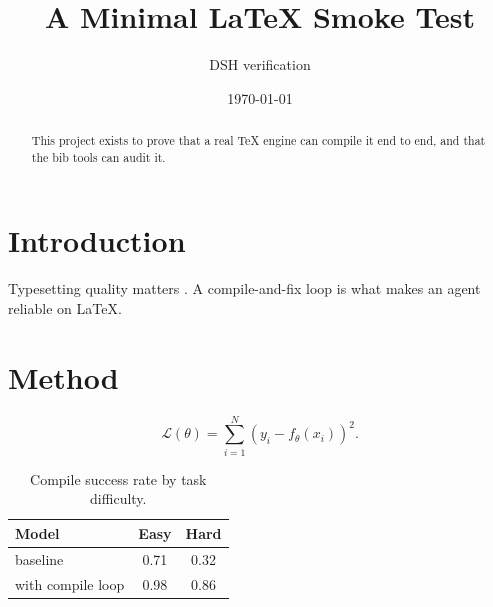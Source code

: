 \documentclass[11pt]{article}
\title{A Minimal LaTeX Smoke Test}
\author{DSH verification}
\date{\today}
\begin{document}
\maketitle

\begin{abstract}
This project exists to prove that a real TeX engine can compile it end to end,
and that the bib tools can audit it.
\end{abstract}

\section{Introduction}
Typesetting quality matters \citep{knuth1984texbook, vaswani2017attention}.
A compile-and-fix loop is what makes an agent reliable on LaTeX.

\section{Method}
\begin{equation}
  \label{eq:main}
  \mathcal{L}(\theta) = \sum_{i=1}^{N} \left( y_i - f_\theta(x_i) \right)^2 .
\end{equation}

\begin{table}[t]
  \centering
  \caption{Compile success rate by task difficulty.}
  \label{tab:rates}
  \begin{tabular}{lcc}
    \toprule
    Model & Easy & Hard \\
    \midrule
    baseline & 0.71 & 0.32 \\
    with compile loop & 0.98 & 0.86 \\
    \bottomrule
  \end{tabular}
\end{table}



\end{document}
